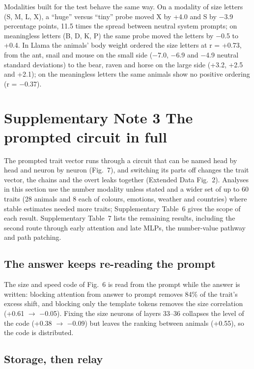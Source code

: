 Modalities built for the test behave the same way. On a modality of size letters (S, M, L, X), a ``huge'' versus ``tiny'' probe moved X by +4.0 and S by $-$3.9 percentage points, 11.5 times the spread between neutral system prompts; on meaningless letters (B, D, K, P) the same probe moved the letters by $-$0.5 to +0.4. In Llama the animals' body weight ordered the size letters at r = +0.73, from the ant, snail and mouse on the small side ($-$7.0, $-$6.9 and $-$4.9 neutral standard deviations) to the bear, raven and horse on the large side (+3.2, +2.5 and +2.1); on the meaningless letters the same animals show no positive ordering (r = $-$0.37).


\section*{Supplementary Note 3 \textperiodcentered{} The prompted circuit in full}

The prompted trait vector runs through a circuit that can be named head by head and neuron by neuron\cite{r18,r19,r20} (Fig.~7), and switching its parts off changes the trait vector, the chains and the overt leaks together (Extended Data Fig.~2). Analyses in this section use the number modality unless stated and a wider set of up to 60 traits (28 animals and 8 each of colours, emotions, weather and countries) where stable estimates needed more traits; Supplementary Table~6 gives the scope of each result. Supplementary Table~7 lists the remaining results, including the second route through early attention and late MLPs, the number-value pathway and path patching.


\subsection*{The answer keeps re-reading the prompt}

The size and speed code of Fig.~6 is read from the prompt while the answer is written: blocking attention from answer to prompt removes 84\% of the trait's excess shift, and blocking only the template tokens removes the size correlation (+0.61 $\rightarrow$ $-$0.05). Fixing the size neurons of layers 33--36 collapses the level of the code (+0.38 $\rightarrow$ $-$0.09) but leaves the ranking between animals (+0.55), so the code is distributed.


\subsection*{Storage, then relay}

